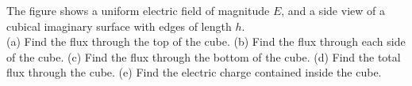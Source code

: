 The figure shows a uniform electric field of magnitude $E$, and a side view of a cubical imaginary surface with
edges of length $h$.\\
(a) Find the flux through the top of the cube.\answercheck\hwendpart
(b) Find the flux through each side of the cube.\answercheck\hwendpart
(c) Find the flux through the bottom of the cube.\answercheck\hwendpart
(d) Find the total flux through the cube.\answercheck\hwendpart
(e) Find the electric charge contained inside the cube.\answercheck\hwendpart
